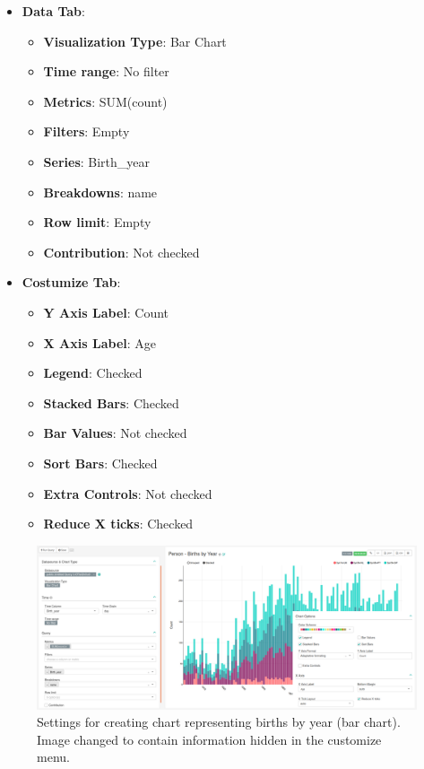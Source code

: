 \documentclass[]{book}
\providecommand{\tightlist}{%
  \setlength{\itemsep}{0pt}\setlength{\parskip}{0pt}}
\begin{document}
\begin{itemize}
\tightlist
\item
  \textbf{Data Tab}:

  \begin{itemize}
  \tightlist
  \item
    \textbf{Visualization Type}: Bar Chart
  \item
    \textbf{Time range}: No filter
  \item
    \textbf{Metrics}: SUM(count)
  \item
    \textbf{Filters}: Empty
  \item
    \textbf{Series}: Birth\_year
  \item
    \textbf{Breakdowns}: name
  \item
    \textbf{Row limit}: Empty
  \item
    \textbf{Contribution}: Not checked
  \end{itemize}
\item
  \textbf{Costumize Tab}:

  \begin{itemize}
  \tightlist
  \item
    \textbf{Y Axis Label}: Count
  \item
    \textbf{X Axis Label}: Age
  \item
    \textbf{Legend}: Checked
  \item
    \textbf{Stacked Bars}: Checked
  \item
    \textbf{Bar Values}: Not checked
  \item
    \textbf{Sort Bars}: Checked
  \item
    \textbf{Extra Controls}: Not checked
  \item
    \textbf{Reduce X ticks}: Checked
  \end{itemize}
\end{itemize}

\begin{figure}
\includegraphics[width=1\linewidth]{images/personBirthsByYear} \caption{Settings for creating chart representing births by year (bar chart). Image changed to contain information hidden in the customize menu.}\label{fig:personBirthsByYear}
\end{figure}
\end{document}
